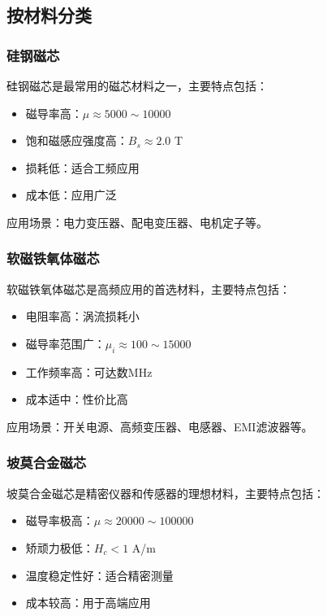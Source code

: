 \documentclass[12pt,UTF8]{ctexbook}
\begin{document}
\subsection{按材料分类}

\subsubsection{硅钢磁芯}

硅钢磁芯是最常用的磁芯材料之一，主要特点包括：

\begin{itemize}[leftmargin=2cm]
    \item 磁导率高：$\mu \approx 5000 \sim 10000$
    \item 饱和磁感应强度高：$B_s \approx 2.0$ T
    \item 损耗低：适合工频应用
    \item 成本低：应用广泛
\end{itemize}

应用场景：电力变压器、配电变压器、电机定子等。

\subsubsection{软磁铁氧体磁芯}

软磁铁氧体磁芯是高频应用的首选材料，主要特点包括：

\begin{itemize}[leftmargin=2cm]
    \item 电阻率高：涡流损耗小
    \item 磁导率范围广：$\mu_i \approx 100 \sim 15000$
    \item 工作频率高：可达数MHz
    \item 成本适中：性价比高
\end{itemize}

应用场景：开关电源、高频变压器、电感器、EMI滤波器等。

\subsubsection{坡莫合金磁芯}

坡莫合金磁芯是精密仪器和传感器的理想材料，主要特点包括：

\begin{itemize}[leftmargin=2cm]
    \item 磁导率极高：$\mu \approx 20000 \sim 100000$
    \item 矫顽力极低：$H_c < 1$ A/m
    \item 温度稳定性好：适合精密测量
    \item 成本较高：用于高端应用
\end{itemize}
\end{document}
